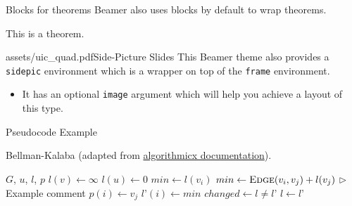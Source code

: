 \documentclass{beamer}
\newcommand{\hrefcol}[2]{\textcolor{uihteal}{\href{#1}{#2}}}
\begin{document}
\begin{frame}{Blocks for theorems}
Beamer also uses blocks by default to wrap theorems.
\begin{theorem} This is a theorem. \end{theorem}
\end{frame}


\begin{sidepic}{assets/uic_quad.pdf}{Side-Picture Slides}
This Beamer theme also provides a \texttt{sidepic} environment which is a wrapper on top of the \texttt{frame} environment.
\begin{itemize}
\item It has an optional \texttt{image} argument which will help you achieve a layout of this type.
\end{itemize}
\end{sidepic}


\renewcommand{\algorithmicrequire}{\textbf{Input:}}
\renewcommand{\algorithmicensure}{\textbf{Output:}}
\newcommand*\CALL[2]{\textsc{#1}(#2)}
\newcommand*\ANNOTATE[1]{\hfill\(\triangleright\) #1}%

\footlinecolor{}

\begin{frame}{Pseudocode Example}
\begin{algorithm}[H]
\fontsize{8}{1}\selectfont
\caption{Bellman-Kalaba (adapted from \hrefcol{https://www.ctan.org/tex-archive/macros/latex/contrib/algorithmicx/algorithmicx.pdf}{algorithmicx documentation}).}
\begin{algorithmic}
\REQUIRE $G$, $u$, $l$, $p$
    \STATE $l(v) \leftarrow \infty$
\ENDFOR
\STATE $l(u) \leftarrow 0$
\REPEAT
        \STATE $min \leftarrow l(v_i)$
            \IF {$min > \CALL{Edge}{v_i, v_j} + l(v_j)$}
                \STATE $min \leftarrow \CALL{Edge}{v_i, v_j} + l(v_j)$ \ANNOTATE{Example comment}
                \STATE $p(i) \leftarrow v_j$
            \ENDIF
        \ENDFOR
        \STATE $l’(i) \leftarrow min$
    \ENDFOR
    \STATE $changed \leftarrow l \not= l’$
    \STATE $l \leftarrow l’$
\end{algorithmic}
\end{algorithm}
\end{frame}


\end{document}
